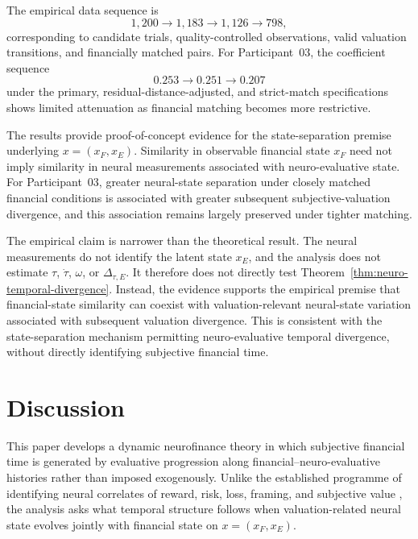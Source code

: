 \documentclass[graybox,natbib]{SNmult}
\providecommand{\1}{}
\renewcommand{\1}{\mathbbm 1}
\begin{document}
The empirical data sequence is
\[
1{,}200\rightarrow1{,}183\rightarrow1{,}126\rightarrow798,
\]
corresponding to candidate trials, quality-controlled observations, valid
valuation transitions, and financially matched pairs. For Participant~03, the
coefficient sequence
\[
0.253\rightarrow0.251\rightarrow0.207
\]
under the primary, residual-distance-adjusted, and strict-match specifications
shows limited attenuation as financial matching becomes more restrictive.

The results provide proof-of-concept evidence for the state-separation premise
underlying \(x=(x_F,x_E)\). Similarity in observable financial state \(x_F\)
need not imply similarity in neural measurements associated with
neuro-evaluative state. For Participant~03, greater neural-state separation
under closely matched financial conditions is associated with greater
subsequent subjective-valuation divergence, and this association remains
largely preserved under tighter matching.

The empirical claim is narrower than the theoretical result. The neural
measurements do not identify the latent state \(x_E\), and the analysis does
not estimate \(\tau\), \(\dot{\tau}\), \(\omega\), or
\(\Delta_{\tau,E}\). It therefore does not directly test
Theorem~\ref{thm:neuro-temporal-divergence}. Instead, the evidence supports the
empirical premise that financial-state similarity can coexist with
valuation-relevant neural-state variation associated with subsequent valuation
divergence. This is consistent with the state-separation mechanism permitting
neuro-evaluative temporal divergence, without directly identifying subjective
financial time.


\section{Discussion}
\label{sec:discussion}

This paper develops a dynamic neurofinance theory in which subjective
financial time is generated by evaluative progression along
financial--neuro-evaluative histories rather than imposed exogenously. Unlike
the established programme of identifying neural correlates of reward, risk,
loss, framing, and subjective value
\citep{CamererLoewensteinPrelec2005,KnutsonAdamsFongHommer2001,
KuhnenKnutson2005,KableGlimcher2007,PreuschoffBossaertsQuartz2006,
DeMartinoKumaranSeymourDolan2006,TomFoxTrepelPoldrack2007,
MiendlarzewskaKometerPreuschoff2019}, the analysis asks what temporal structure
follows when valuation-related neural state evolves jointly with financial
state on \(x=(x_F,x_E)\).
\end{document}
